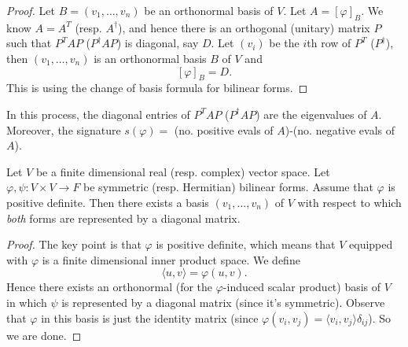 \documentclass[a4paper]{scrartcl}
\begin{document}
\begin{proof}
      Let $B=(v_1,\ldots ,v_n)$ be an orthonormal basis of $V$. Let $A=[\varphi]_B$. We know $A=A^T$ (resp. $A^\dagger$), and hence there is an orthogonal (unitary) matrix $P$ such that $P^TAP$ ($P^\dagger AP$) is diagonal, say $D$. Let $(v_i)$ be the $i$th row of $P^T$ ($P^\dagger$), then $(v_1,\ldots , v_n)$ is an orthonormal basis $B$ of $V$ and 
      \[[\varphi]_B=D.\]
      This is using the change of basis formula for bilinear forms.
\end{proof}

\begin{remark}
      In this process, the diagonal entries of $P^TAP$ ($P^\dagger AP$) are the eigenvalues of $A$. Moreover, the signature $s (\varphi)=$ (no. positive evals of $A$)-(no. negative evals of $A$).
\end{remark}

\begin{corollary}
     Let $V$ be a finite dimensional real (resp. complex) vector space. Let $\varphi, \psi : V \times V \rightarrow F$ be symmetric (resp. Hermitian) bilinear forms. Assume that $\varphi$ is positive definite. Then there exists a basis $(v_1, \ldots ,v_n)$ of $V$ with respect to which \emph{both} forms are represented by a diagonal matrix. 
\end{corollary}
\begin{proof}
     The key point is that $\varphi$ is positive definite, which means that $V$ equipped with $\varphi$ is a finite dimensional inner product space. We define 
     \[\langle u,v \rangle =\varphi (u,v).\]
     Hence there exists an orthonormal (for the $\varphi$-induced scalar product) basis of $V$ in which $\psi$ is represented by a diagonal matrix (since it's symmetric). Observe that $\varphi$ in this basis is just the identity matrix (since $\varphi (v_i,v_j)=\langle v_i,v_j \rangle \delta_{ij}$). So we are done.
\end{proof}
\end{document}
